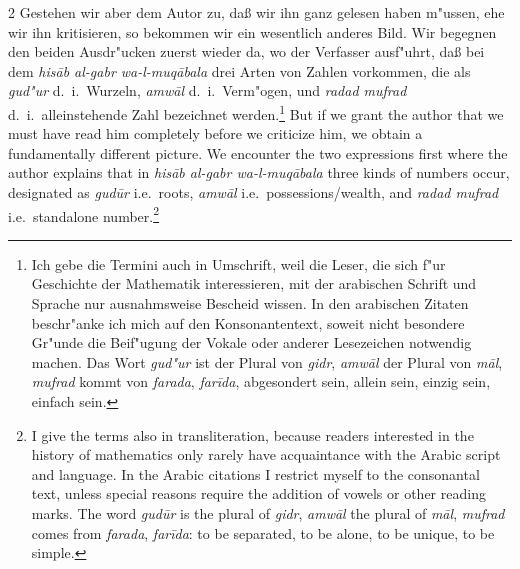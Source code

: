 \documentclass[10pt,a4paper]{article}
\renewcommand{\switchcolumn}{\syncronize\nointerlineskip\columnbreak}
\begin{document}
\begin{paracol}{2}
Gestehen wir aber dem Autor zu, da\ss{} wir ihn ganz gelesen haben m"ussen, ehe wir ihn kritisieren, so bekommen wir ein wesentlich anderes Bild. Wir begegnen den beiden Ausdr"ucken zuerst wieder da, wo der Verfasser ausf"uhrt, da\ss{} bei dem \textit{his\=ab al-gabr wa-l-muq\=abala} drei Arten von Zahlen vorkommen, die als \textit{gud"ur} d.\ i.\ Wurzeln, \textit{amw\=al} d.\ i.\ Verm"ogen, und \textit{radad mufrad} d.\ i.\ alleinstehende Zahl bezeichnet werden.\footnote{Ich gebe die Termini auch in Umschrift, weil die Leser, die sich f"ur Geschichte der Mathematik interessieren, mit der arabischen Schrift und Sprache nur ausnahmsweise Bescheid wissen. In den arabischen Zitaten beschr"anke ich mich auf den Konsonantentext, soweit nicht besondere Gr"unde die Beif"ugung der Vokale oder anderer Lesezeichen notwendig machen. Das Wort \textit{gud"ur} ist der Plural von \textit{gidr}, \textit{amw\=al} der Plural von \textit{m\=al}, \textit{mufrad} kommt von \textit{farada}, \textit{far\={i}da}, abgesondert sein, allein sein, einzig sein, einfach sein.}
\switchcolumn
But if we grant the author that we must have read him completely before we criticize him, we obtain a fundamentally different picture. We encounter the two expressions first where the author explains that in \textit{his\=ab al-gabr wa-l-muq\=abala} three kinds of numbers occur, designated as \textit{gud\=ur} i.e.\ roots, \textit{amw\=al} i.e.\ possessions/wealth, and \textit{radad mufrad} i.e.\ standalone number.\footnote{I give the terms also in transliteration, because readers interested in the history of mathematics only rarely have acquaintance with the Arabic script and language. In the Arabic citations I restrict myself to the consonantal text, unless special reasons require the addition of vowels or other reading marks. The word \textit{gud\=ur} is the plural of \textit{gidr}, \textit{amw\=al} the plural of \textit{m\=al}, \textit{mufrad} comes from \textit{farada}, \textit{far\={i}da}: to be separated, to be alone, to be unique, to be simple.}
\end{paracol}
\end{document}
